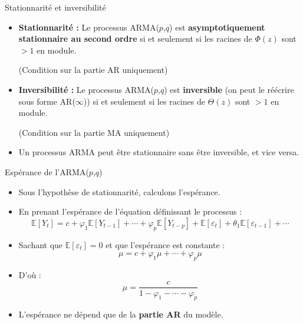 \documentclass[11pt,aspectratio=169]{beamer}
\newcommand{\E}{\mathbb{E}}
\begin{document}
\begin{frame}{Stationnarité et inversibilité}

\begin{itemize}

\item \textbf{Stationnarité :} Le processus ARMA($p$,$q$) est \textbf{asymptotiquement stationnaire au second ordre} si et seulement si les racines de $\Phi(z)$ sont $> 1$ en module.

(Condition sur la partie AR uniquement)\newline

\item \textbf{Inversibilité :} Le processus ARMA($p$,$q$) est \textbf{inversible} (on peut le réécrire sous forme AR($\infty$)) si et seulement si les racines de $\Theta(z)$ sont $> 1$ en module.

(Condition sur la partie MA uniquement)\newline

\item Un processus ARMA peut être stationnaire sans être inversible, et vice versa.

\end{itemize}
\end{frame}

\begin{frame}{Espérance de l'ARMA($p$,$q$)}

\begin{itemize}

\item Sous l'hypothèse de stationnarité, calculons l'espérance.\newline

\item En prenant l'espérance de l'équation définissant le processus :
\[
\E[Y_t] = c + \varphi_1 \E[Y_{t-1}] + \cdots + \varphi_p \E[Y_{t-p}] + \E[\varepsilon_t] + \theta_1 \E[\varepsilon_{t-1}] + \cdots
\]

\item Sachant que $\E[\varepsilon_t] = 0$ et que l'espérance est constante :
\[
\mu = c + \varphi_1 \mu + \cdots + \varphi_p \mu
\]

\item D'où :
\[
\boxed{\mu = \frac{c}{1 - \varphi_1 - \cdots - \varphi_p}}
\]

\item L'espérance ne dépend que de la \textbf{partie AR} du modèle.

\end{itemize}
\end{frame}
\end{document}

